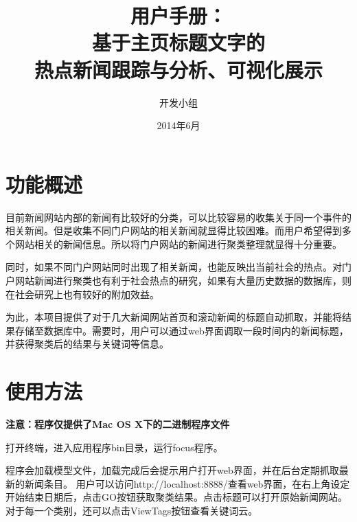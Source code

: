 \documentclass[12pt]{article}
\begin{document}
\title{用户手册：\\[3ex] 基于主页标题文字的\\热点新闻跟踪与分析、可视化展示\\[3ex]}

\author{开发小组}

\date{2014年6月}
\maketitle
\newpage
\renewcommand{\contentsname}{用户手册}
\tableofcontents
\newpage
\section{功能概述}

目前新闻网站内部的新闻有比较好的分类，可以比较容易的收集关于同一个事件的相关新闻。但是收集不同门户网站的相关新闻就显得比较困难。而用户希望得到多个网站相关的新闻信息。所以将门户网站的新闻进行聚类整理就显得十分重要。

同时，如果不同门户网站同时出现了相关新闻，也能反映出当前社会的热点。对门户网站新闻进行聚类也有利于社会热点的研究，如果有大量历史数据的数据库，则在社会研究上也有较好的附加效益。

为此，本项目提供了对于几大新闻网站首页和滚动新闻的标题自动抓取，并能将结果存储至数据库中。需要时，用户可以通过web界面调取一段时间内的新闻标题，并获得聚类后的结果与关键词等信息。

\section{使用方法}

\textbf{注意：程序仅提供了Mac OS X下的二进制程序文件}

打开终端，进入应用程序bin目录，运行focus程序。

程序会加载模型文件，加载完成后会提示用户打开web界面，并在后台定期抓取最新的新闻条目。
用户可以访问http://localhost:8888/查看web界面，在右上角设定开始结束日期后，点击GO按钮获取聚类结果。点击标题可以打开原始新闻网站。对于每一个类别，还可以点击ViewTags按钮查看关键词云。
\end{document}
